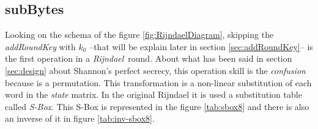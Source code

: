 \documentclass[10pt,a4paper,twoside]{llncs}
\newcommand{\rijndael}{\emph{Rijndael}}
\begin{document}
\subsection{subBytes}\label{sec:subBytes}

Looking on the schema of the figure \ref{fig:RijndaelDiagram}, skipping the \emph{addRoundKey} with $k_0$ --that will be explain later in section \ref{sec:addRoundKey}-- is the first operation in a \rijndael\, round. About what has been said in section \ref{sec:design} about Shannon's perfect secrecy, this operation skill is the \emph{confusion} because is a permutation. This transformation is a non-linear substitution of each word in the \emph{state} matrix. In the original Rijndael it is used a substitution table called \emph{S-Box}. This S-Box is represented in the figure \ref{tab:sbox8} and there is also an inverse of it in figure \ref{tab:inv-sbox8}.
\end{document}
